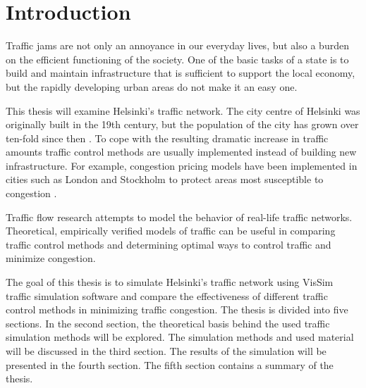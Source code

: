 \documentclass[english, 12pt, a4paper, elec, utf8, pdfa, online]{aaltothesis}
\begin{document}


\cleardoublepage

\section{Introduction}

\thispagestyle{empty}

Traffic jams are not only an annoyance in our everyday lives, but also a burden on the efficient functioning of the society. One of the basic tasks of a state is to build and maintain infrastructure that is sufficient to support the local economy, but the rapidly developing urban areas do not make it an easy one.

This thesis will examine Helsinki's traffic network. The city centre of Helsinki was originally built in the 19th century, but the population of the city has grown over ten-fold since then \cite{helsinki}. To cope with the resulting dramatic increase in traffic amounts traffic control methods are usually implemented instead of building new infrastructure. For example, congestion pricing models have been implemented in cities such as London and Stockholm to protect areas most susceptible to congestion \cite{congestionpricing}.

Traffic flow research attempts to model the behavior of real-life traffic networks. Theoretical, empirically verified models of traffic can be useful in comparing traffic control methods and determining optimal ways to control traffic and minimize congestion.

The goal of this thesis is to simulate Helsinki's traffic network using VisSim traffic simulation software and compare the effectiveness of different traffic control methods in minimizing traffic congestion. The thesis is divided into five sections. In the second section, the theoretical basis behind the used traffic simulation methods will be explored. The simulation methods and used material will be discussed in the third section. The results of the simulation will be presented in the fourth section. The fifth section contains a summary of the thesis.
\end{document}
